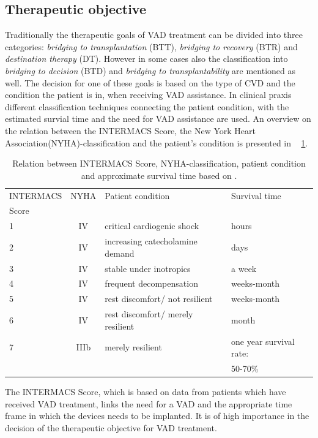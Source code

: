 \subsection{Therapeutic objective}
Traditionally the therapeutic goals of VAD treatment can be divided into three categories: \textit{bridging to transplantation} (BTT), \textit{bridging to recovery} (BTR) and \textit{destination therapy} (DT). However in some cases also the classification into \textit{bridging to decision} (BTD) and \textit{bridging to transplantability} are mentioned as well. The decision for one of these goals is based on the type of CVD and the condition the patient is in, when receiving VAD assistance. \cite{VAD6} In clinical praxis different classification techniques connecting the patient condition, with the estimated survial time and the need for VAD assistance are used. An overview on the relation between the INTERMACS Score, the New York Heart Association(NYHA)-classification and the patient's condition is presented in \tablename~ \ref{tab:Table1}.
\begin{table}
  \begin{tabularx}{\textwidth}{l|c|l|l}
    \toprule
    INTERMACS & NYHA & Patient condition & Survival time  \\
    Score & & &\\
    \midrule
    1 & IV & critical cardiogenic shock & hours \\
    2 & IV & increasing catecholamine demand & days \\
    3 & IV & stable under inotropics & a week \\
    4 & IV & frequent decompensation & weeks-month \\
    5 & IV & rest discomfort/ not resilient & weeks-month \\
    6 & IV & rest discomfort/ merely resilient & month \\
    7 & IIIb & merely resilient & one year survival rate: \\
     & & & 50-70\% \\
     \bottomrule
  \end{tabularx}
  \caption[Relation between INTERMACS Score and NYHA-classification]{Relation between INTERMACS Score, NYHA-classification, patient condition and approximate survival time based on \cite{VAD5}.}
  \label{tab:Table1}
\end{table}
The INTERMACS Score, which is based on data from patients which have received VAD treatment, links the need for a VAD and the appropriate time frame in which the devices needs to be implanted. It is of high importance in the decision of the therapeutic objective for VAD treatment. \cite{VAD7}
